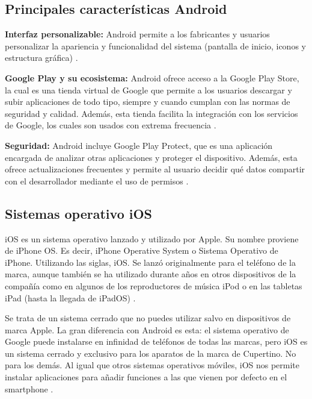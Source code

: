 \subsection{Principales características Android}

    \begin{list}{}%
    {\setlength{\leftmargin}{1cm}%
     \setlength{\rightmargin}{1cm}%
     \setlength{\itemsep}{0.5\baselineskip}%
     \setlength{\parsep}{0pt}}
     
    \item\relax
    \small
    \textbf{Interfaz personalizable:} Android permite a los fabricantes y usuarios personalizar la apariencia y funcionalidad del sistema (pantalla de inicio, iconos y estructura gráfica) \cite{CitaD4}. 
    
    \item\relax
    \small
    \textbf{Google Play y su ecosistema:} Android ofrece acceso a la Google Play Store, la cual es una tienda virtual de Google que permite a los usuarios descargar y subir aplicaciones de todo tipo, siempre y cuando cumplan con las normas de seguridad y calidad. Además, esta tienda facilita la integración con los servicios de Google, los cuales son usados con extrema frecuencia \cite{CitaD4}.
    
    \item\relax
    \small
    \textbf{Seguridad:} Android incluye Google Play Protect, que es una aplicación encargada de analizar otras aplicaciones y proteger el dispositivo. Además, esta ofrece actualizaciones frecuentes y permite al usuario decidir qué datos compartir con el desarrollador mediante el uso de permisos \cite{CitaD4}.
    
    \end{list}

\subsection{Sistemas operativo iOS}

\begin{list}{}%
    {\setlength{\leftmargin}{1cm}\setlength{\rightmargin}{1cm}}
    \item\relax
    \small
    iOS es un sistema operativo lanzado y utilizado por Apple. Su nombre proviene de iPhone OS. Es decir, iPhone Operative System o Sistema Operativo de iPhone. Utilizando las siglas, iOS. Se lanzó originalmente para el teléfono de la marca, aunque también se ha utilizado durante años en otros dispositivos de la compañía como en algunos de los reproductores de música iPod o en las tabletas iPad (hasta la llegada de iPadOS) \cite{CitaD5}.

    Se trata de un sistema cerrado que no puedes utilizar salvo en dispositivos de marca Apple. La gran diferencia con Android es esta: el sistema operativo de Google puede instalarse en infinidad de teléfonos de todas las marcas, pero iOS es un sistema cerrado y exclusivo para los aparatos de la marca de Cupertino. No para los demás. Al igual que otros sistemas operativos móviles, iOS nos permite instalar aplicaciones para añadir funciones a las que vienen por defecto en el smartphone \cite{CitaD5}.

\end{list}
    
